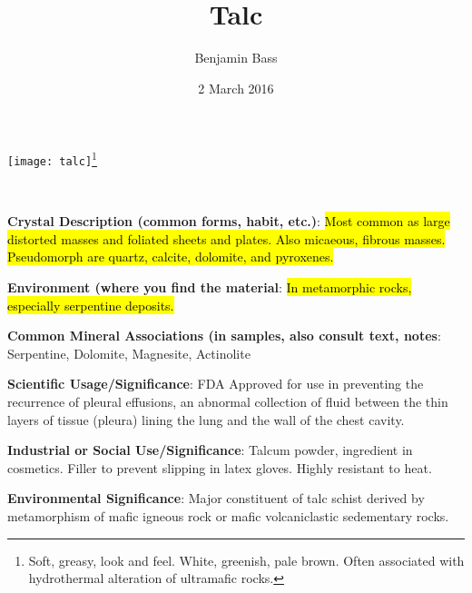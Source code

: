 \documentclass[10pt]{article}
\author{Benjamin Bass}
\date{2 March 2016}
\title{\vspace{-2.0cm}Talc} %
\begin{document}
\maketitle


\begin{center}
  \texttt{[image: talc]}\footnote{Soft, greasy, look and feel. White, greenish, pale brown. Often associated with hydrothermal alteration of ultramafic rocks.}
\end{center}



\
\
\
\
\
\
\
\
\
\

\begin{framed}
  \textbf{Crystal Description (common forms, habit, etc.)}: \hl{Most common as large distorted masses and foliated sheets and plates. Also micaeous, fibrous masses. Pseudomorph are quartz, calcite, dolomite, and pyroxenes.}
\end{framed}

\begin{framed}
  \textbf{Environment (where you find the material}: \hl{In metamorphic rocks, especially serpentine deposits.}
\end{framed}

\begin{framed}
  \textbf{Common Mineral Associations (in samples, also consult text, notes}: Serpentine, Dolomite, Magnesite, Actinolite
\end{framed}

\begin{framed}
  \textbf{Scientific Usage/Significance}: FDA Approved for use in preventing the recurrence of pleural effusions, an abnormal collection of fluid between the thin layers of tissue (pleura) lining the lung and the wall of the chest cavity.
\end{framed}

\begin{framed}
  \textbf{Industrial or Social Use/Significance}: Talcum powder, ingredient in cosmetics. Filler to prevent slipping in latex gloves. Highly resistant to heat.
\end{framed}

\begin{framed}
  \textbf{Environmental Significance}: Major constituent of talc schist derived by metamorphism of mafic igneous rock or mafic volcaniclastic sedementary rocks.
\end{framed}

\end{document}
